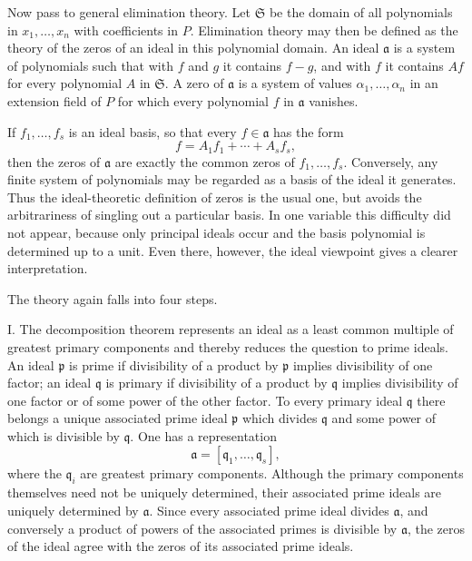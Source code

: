 \documentclass[11pt]{article}
\begin{document}
Now pass to general elimination theory. Let $\mathfrak S$ be the domain of all polynomials in $x_1,\ldots,x_n$ with coefficients in $P$. Elimination theory may then be defined as the theory of the zeros of an ideal in this polynomial domain. An ideal $\mathfrak a$ is a system of polynomials such that with $f$ and $g$ it contains $f-g$, and with $f$ it contains $Af$ for every polynomial $A$ in $\mathfrak S$. A zero of $\mathfrak a$ is a system of values $\alpha_1,\ldots,\alpha_n$ in an extension field of $P$ for which every polynomial $f$ in $\mathfrak a$ vanishes.

If $f_1,\ldots,f_s$ is an ideal basis, so that every $f\in\mathfrak a$ has the form
\[
  f=A_1f_1+\cdots+A_sf_s,
\]
then the zeros of $\mathfrak a$ are exactly the common zeros of $f_1,\ldots,f_s$. Conversely, any finite system of polynomials may be regarded as a basis of the ideal it generates. Thus the ideal-theoretic definition of zeros is the usual one, but avoids the arbitrariness of singling out a particular basis. In one variable this difficulty did not appear, because only principal ideals occur and the basis polynomial is determined up to a unit. Even there, however, the ideal viewpoint gives a clearer interpretation.

The theory again falls into four steps.

I. The decomposition theorem represents an ideal as a least common multiple of greatest primary components and thereby reduces the question to prime ideals. An ideal $\mathfrak p$ is prime if divisibility of a product by $\mathfrak p$ implies divisibility of one factor; an ideal $\mathfrak q$ is primary if divisibility of a product by $\mathfrak q$ implies divisibility of one factor or of some power of the other factor. To every primary ideal $\mathfrak q$ there belongs a unique associated prime ideal $\mathfrak p$ which divides $\mathfrak q$ and some power of which is divisible by $\mathfrak q$. One has a representation
\[
  \mathfrak a=[\mathfrak q_1,\ldots,\mathfrak q_s],
\]
where the $\mathfrak q_i$ are greatest primary components. Although the primary components themselves need not be uniquely determined, their associated prime ideals are uniquely determined by $\mathfrak a$. Since every associated prime ideal divides $\mathfrak a$, and conversely a product of powers of the associated primes is divisible by $\mathfrak a$, the zeros of the ideal agree with the zeros of its associated prime ideals.
\end{document}
